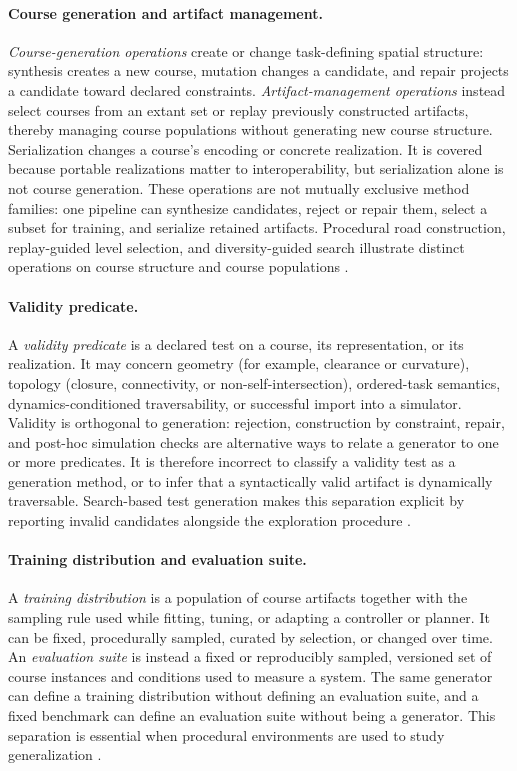 \paragraph{Course generation and artifact management.}
\emph{Course-generation operations} create or change task-defining spatial
structure: synthesis creates a new course, mutation changes a candidate, and repair
projects a candidate toward declared constraints. \emph{Artifact-management
operations} instead select courses from an extant set or replay previously
constructed artifacts, thereby managing course populations without generating new
course structure. Serialization changes a course's encoding or concrete realization.
It is covered because portable realizations matter to interoperability, but
serialization alone is not course generation. These operations are not mutually
exclusive method families: one pipeline can synthesize candidates, reject or repair
them, select a subset for training, and serialize retained artifacts. Procedural road
construction, replay-guided level selection, and diversity-guided search illustrate
distinct operations on course structure and course populations
\cite{Li2020ImprovingGeneralization,Jiang2021ReplayGuided,Blattner2024DiversityGuided}.

\paragraph{Validity predicate.}
A \emph{validity predicate} is a declared test on a course, its representation, or
its realization. It may concern geometry (for example, clearance or curvature),
topology (closure, connectivity, or non-self-intersection), ordered-task semantics,
dynamics-conditioned traversability, or successful import into a simulator. Validity
is orthogonal to generation: rejection, construction by constraint, repair, and
post-hoc simulation checks are alternative ways to relate a generator to one or
more predicates. It is therefore incorrect to classify a validity test as a
generation method, or to infer that a syntactically valid artifact is dynamically
traversable. Search-based test generation makes this separation explicit by
reporting invalid candidates alongside the exploration procedure
\cite{Blattner2024DiversityGuided}.

\paragraph{Training distribution and evaluation suite.}
A \emph{training distribution} is a population of course artifacts together with
the sampling rule used while fitting, tuning, or adapting a controller or planner.
It can be fixed, procedurally sampled, curated by selection, or changed over time.
An \emph{evaluation suite} is instead a fixed or reproducibly sampled, versioned
set of course instances and conditions used to measure a system. The same generator
can define a training distribution without defining an evaluation suite, and a fixed
benchmark can define an evaluation suite without being a generator. This separation
is essential when procedural environments are used to study generalization
\cite{Cobbe2020LeveragingProcedural}.

